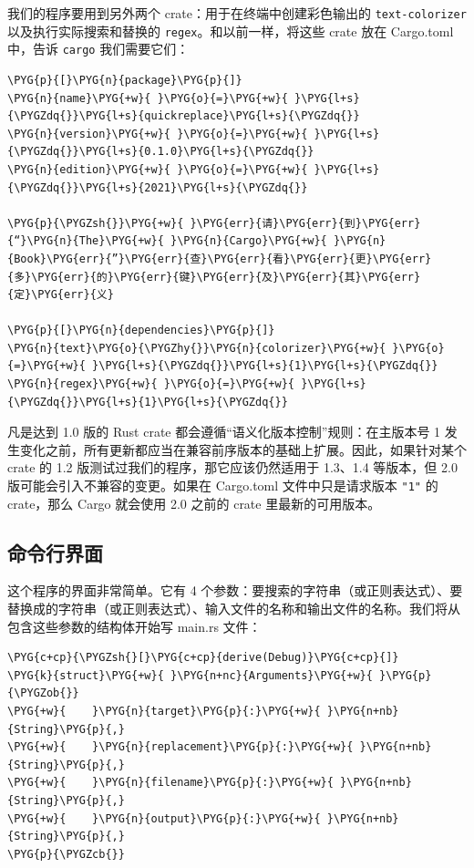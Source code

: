 我们的程序要用到另外两个 crate：用于在终端中创建彩色输出的 \texttt{text-colorizer} 以及执行实际搜索和替换的 \texttt{regex}。和以前一样，将这些 crate 放在 Cargo.toml 中，告诉 \texttt{cargo} 我们需要它们：

\begin{Verbatim}[commandchars=\\\{\},breaklines=true,breakanywhere=true,fontsize=\codefont,xleftmargin=17bp]
\PYG{p}{[}\PYG{n}{package}\PYG{p}{]}
\PYG{n}{name}\PYG{+w}{ }\PYG{o}{=}\PYG{+w}{ }\PYG{l+s}{\PYGZdq{}}\PYG{l+s}{quickreplace}\PYG{l+s}{\PYGZdq{}}
\PYG{n}{version}\PYG{+w}{ }\PYG{o}{=}\PYG{+w}{ }\PYG{l+s}{\PYGZdq{}}\PYG{l+s}{0.1.0}\PYG{l+s}{\PYGZdq{}}
\PYG{n}{edition}\PYG{+w}{ }\PYG{o}{=}\PYG{+w}{ }\PYG{l+s}{\PYGZdq{}}\PYG{l+s}{2021}\PYG{l+s}{\PYGZdq{}}

\PYG{p}{\PYGZsh{}}\PYG{+w}{ }\PYG{err}{请}\PYG{err}{到}\PYG{err}{“}\PYG{n}{The}\PYG{+w}{ }\PYG{n}{Cargo}\PYG{+w}{ }\PYG{n}{Book}\PYG{err}{”}\PYG{err}{查}\PYG{err}{看}\PYG{err}{更}\PYG{err}{多}\PYG{err}{的}\PYG{err}{键}\PYG{err}{及}\PYG{err}{其}\PYG{err}{定}\PYG{err}{义}

\PYG{p}{[}\PYG{n}{dependencies}\PYG{p}{]}
\PYG{n}{text}\PYG{o}{\PYGZhy{}}\PYG{n}{colorizer}\PYG{+w}{ }\PYG{o}{=}\PYG{+w}{ }\PYG{l+s}{\PYGZdq{}}\PYG{l+s}{1}\PYG{l+s}{\PYGZdq{}}
\PYG{n}{regex}\PYG{+w}{ }\PYG{o}{=}\PYG{+w}{ }\PYG{l+s}{\PYGZdq{}}\PYG{l+s}{1}\PYG{l+s}{\PYGZdq{}}
\end{Verbatim}

凡是达到 1.0 版的 Rust crate 都会遵循“语义化版本控制”规则：在主版本号 1 发生变化之前，所有更新都应当在兼容前序版本的基础上扩展。因此，如果针对某个 crate 的 1.2 版测试过我们的程序，那它应该仍然适用于 1.3、1.4 等版本，但 2.0 版可能会引入不兼容的变更。如果在 Cargo.toml 文件中只是请求版本 \texttt{"1"} 的 crate，那么 Cargo 就会使用 2.0 之前的 crate 里最新的可用版本。

\subsection{命令行界面}

这个程序的界面非常简单。它有 4 个参数：要搜索的字符串（或正则表达式）、要替换成的字符串（或正则表达式）、输入文件的名称和输出文件的名称。我们将从包含这些参数的结构体开始写 main.rs 文件：

\begin{Verbatim}[commandchars=\\\{\},breaklines=true,breakanywhere=true,fontsize=\codefont,xleftmargin=17bp]
\PYG{c+cp}{\PYGZsh{}[}\PYG{c+cp}{derive(Debug)}\PYG{c+cp}{]}
\PYG{k}{struct}\PYG{+w}{ }\PYG{n+nc}{Arguments}\PYG{+w}{ }\PYG{p}{\PYGZob{}}
\PYG{+w}{    }\PYG{n}{target}\PYG{p}{:}\PYG{+w}{ }\PYG{n+nb}{String}\PYG{p}{,}
\PYG{+w}{    }\PYG{n}{replacement}\PYG{p}{:}\PYG{+w}{ }\PYG{n+nb}{String}\PYG{p}{,}
\PYG{+w}{    }\PYG{n}{filename}\PYG{p}{:}\PYG{+w}{ }\PYG{n+nb}{String}\PYG{p}{,}
\PYG{+w}{    }\PYG{n}{output}\PYG{p}{:}\PYG{+w}{ }\PYG{n+nb}{String}\PYG{p}{,}
\PYG{p}{\PYGZcb{}}
\end{Verbatim}

